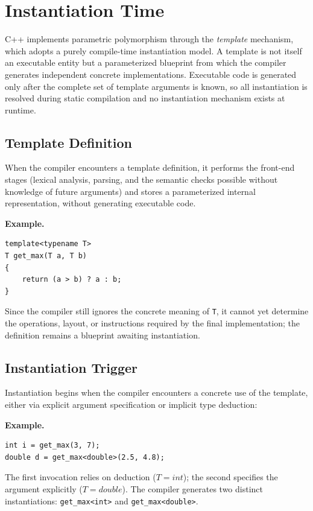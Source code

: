 \documentclass[11pt]{report}
\begin{document}
\section{Instantiation Time}
\label{CppTemplates:InstantiationTime}

C++ implements parametric polymorphism through the \emph{template} mechanism, which
adopts a purely compile-time instantiation model. A template is not itself an
executable entity but a parameterized blueprint from which the compiler generates
independent concrete implementations. Executable code is generated only after the
complete set of template arguments is known, so all instantiation is resolved during
static compilation and no instantiation mechanism exists at runtime.

\subsection{Template Definition}


When the compiler encounters a template definition, it performs the front-end
stages (lexical analysis, parsing, and the semantic checks possible without
knowledge of future arguments) and stores a parameterized internal representation,
without generating executable code.
\begin{examplebox}
\textbf{Example.}

\begin{lstlisting}
template<typename T>
T get_max(T a, T b)
{
    return (a > b) ? a : b;
}
\end{lstlisting}
\end{examplebox}

Since the compiler still ignores the concrete meaning of \texttt{T}, it cannot yet
determine the operations, layout, or instructions required by the final
implementation; the definition remains a blueprint awaiting instantiation.


\subsection{Instantiation Trigger}
\label{CppTemplates:InstantiationTimeInitializationTrigger}

Instantiation begins when the compiler encounters a concrete use of the template,
either via explicit argument specification or implicit type deduction:

\begin{examplebox}
\textbf{Example.}

\begin{lstlisting}
int i = get_max(3, 7);
double d = get_max<double>(2.5, 4.8);
\end{lstlisting}

The first invocation relies on deduction ($T = int$); the second specifies the
argument explicitly ($T = double$). The compiler generates two distinct
instantiations: \texttt{get\_max<int>} and \texttt{get\_max<double>}.
\end{examplebox}
\end{document}

